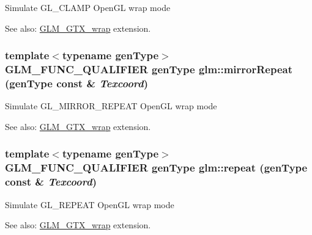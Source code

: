 Simulate GL\_\-CLAMP OpenGL wrap mode \begin{Desc}
\item[See also:]\hyperlink{group__gtx__wrap}{GLM\_\-GTX\_\-wrap} extension. \end{Desc}
\hypertarget{group__gtx__wrap_g03ce460f4f1bbc3058ce0d4928e29071}{
\subsubsection[mirrorRepeat]{\setlength{\rightskip}{0pt plus 5cm}template$<$typename genType$>$ GLM\_\-FUNC\_\-QUALIFIER genType glm::mirrorRepeat (genType const \& {\em Texcoord})}}
\label{group__gtx__wrap_g03ce460f4f1bbc3058ce0d4928e29071}


Simulate GL\_\-MIRROR\_\-REPEAT OpenGL wrap mode \begin{Desc}
\item[See also:]\hyperlink{group__gtx__wrap}{GLM\_\-GTX\_\-wrap} extension. \end{Desc}
\hypertarget{group__gtx__wrap_g0e136d75883428ad7d9c19611290d77a}{
\subsubsection[repeat]{\setlength{\rightskip}{0pt plus 5cm}template$<$typename genType$>$ GLM\_\-FUNC\_\-QUALIFIER genType glm::repeat (genType const \& {\em Texcoord})}}
\label{group__gtx__wrap_g0e136d75883428ad7d9c19611290d77a}


Simulate GL\_\-REPEAT OpenGL wrap mode \begin{Desc}
\item[See also:]\hyperlink{group__gtx__wrap}{GLM\_\-GTX\_\-wrap} extension. \end{Desc}
